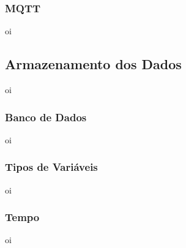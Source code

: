     	\begin{figure}[!h]
    	\end{figure}
    	
    	\begin{figure}[!h]
    	\end{figure}
        
        \subsubsection{MQTT}
        \label{sec:aquisicao-mqtt}
        oi

    \subsection{Armazenamento dos Dados}
    \label{sec:armazenamento-dados}
        oi
        
        \subsubsection{Banco de Dados}
        \label{sec:banco-dados}
        oi
        
        \subsubsection{Tipos de Variáveis}
        \label{sec:tipos-variaveis}
        oi
        
        \subsubsection{Tempo}
        \label{sec:tempo}
        oi
    

